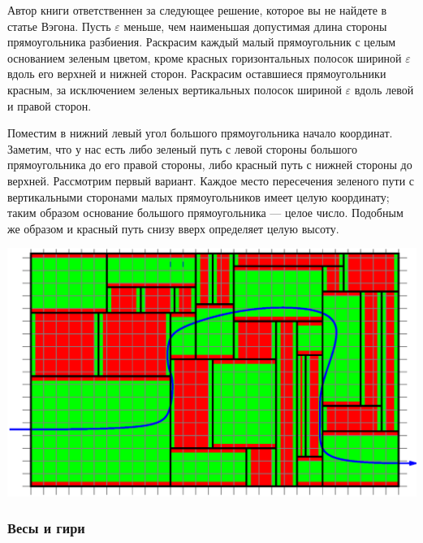 Автор книги ответственнен за следующее решение, которое вы не найдете в статье Вэгона.
Пусть $\varepsilon$ меньше, чем наименьшая допустимая длина стороны прямоугольника разбиения.
Раскрасим каждый малый прямоугольник с целым основанием зеленым цветом, кроме красных горизонтальных  полосок  шириной $\varepsilon$ вдоль его верхней и нижней  сторон.
Раскрасим оставшиеся прямоугольники красным, за исключением зеленых вертикальных   полосок  шириной $\varepsilon$ вдоль левой и правой сторон.


Поместим в нижний левый  угол  большого прямоугольника начало координат. 
Заметим, что у нас есть либо зеленый путь с левой стороны  большого прямоугольника до его правой стороны, либо красный путь с нижней стороны до верхней. 
Рассмотрим первый вариант.
Каждое  место пересечения  зеленого пути с вертикальными  сторонами  малых прямоугольников имеет целую координату; таким образом основание большого прямоугольника --- целое число.
Подобным же образом и красный путь снизу вверх определяет целую высоту.



\begin{center}
\includegraphics[scale=0.5]{Figs/Insight/green}
\end{center}




	







\subsubsection*{Весы и гири}    %

